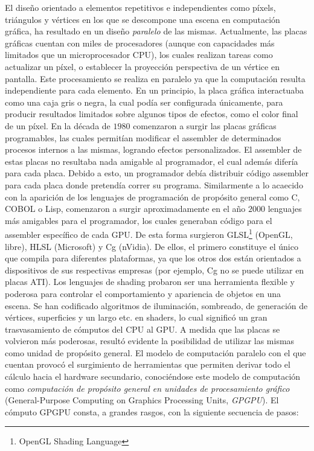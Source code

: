 El diseño orientado a elementos repetitivos e independientes como píxels, triángulos y vértices en los que se descompone una escena en computación gráfica, ha resultado en un diseño {\em paralelo} de las mismas.
Actualmente, las placas gráficas cuentan con miles de procesadores (aunque con capacidades más limitados que un microprocesador CPU), los cuales realizan tareas como actualizar un píxel, o establecer la proyección perspectiva de un vértice en pantalla.
Este procesamiento se realiza en paralelo ya que la computación resulta independiente para cada elemento.
En un principio, la placa gráfica interactuaba como una caja gris o negra, la cual podía ser configurada únicamente, para producir resultados limitados sobre algunos tipos de efectos, como el color final de un píxel.
En la década de $1980$ comenzaron a surgir las placas gráficas programables, las cuales permitían modificar el assembler de determinados procesos internos a las mismas, logrando efectos personalizados.
El assembler de estas placas no resultaba nada amigable al programador, el cual además difería para cada placa.
Debido a esto, un programador debía distribuir código assembler para cada placa donde pretendía correr su programa.
Similarmente a lo acaecido con la aparición de los lenguajes de programación de propósito general como C, COBOL o Lisp, comenzaron a surgir aproximadamente en el año $2000$ lenguajes más amigables para el programador, los cuales generaban código para el assembler específico de cada GPU.
De esta forma surgieron GLSL\footnote{OpenGL Shading Language} (OpenGL, libre), HLSL (Microsoft) y Cg (nVidia).
De ellos, el primero constituye el único que compila para diferentes plataformas, ya que los otros dos están orientados a dispositivos de sus respectivas empresas (por ejemplo, Cg no se puede utilizar en placas ATI).
Los lenguajes de shading probaron ser una herramienta flexible y poderosa para controlar el comportamiento y apariencia de objetos en una escena.
Se han codificado algoritmos de iluminación, sombreado, de generación de vértices, superficies y un largo etc. en shaders, lo cual significó un gran trasvasamiento de cómputos del CPU al GPU.
A medida que las placas se volvieron más poderosas, resultó evidente la posibilidad de utilizar las mismas como unidad de propósito general.
El modelo de computación paralelo con el que cuentan provocó el surgimiento de herramientas que permiten derivar todo el cálculo hacia el hardware secundario, conoci\'endose este modelo de computaci\'on como {\em computación de propósito general en unidades de procesamiento gráfico} (General-Purpose Computing on Graphics Processing Units, {\em \acrshort{GPGPU}}).
El cómputo GPGPU consta, a grandes rasgos, con la siguiente secuencia de pasos: 

